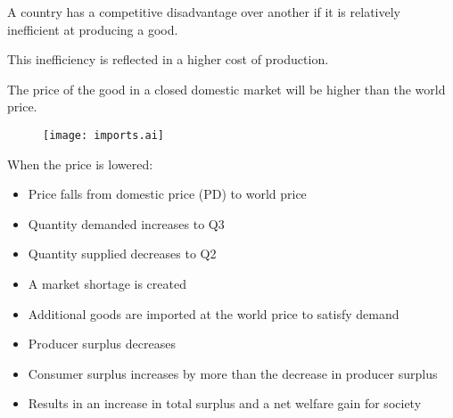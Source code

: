 \documentclass[a4paper,11pt]{article}
\begin{document}
A country has a competitive disadvantage over another if it is relatively
inefficient at producing a good.

This inefficiency is reflected in a higher cost of production.

The price of the good in a closed domestic market will be higher than the world
price.

\begin{figure}
\begin{center}
\texttt{[image: imports.ai]}
\end{center}
\end{figure}

When the price is lowered:

\begin{itemize}
\item Price falls from domestic price (PD) to world price
\item Quantity demanded increases to Q3
\item Quantity supplied decreases to Q2
\item A market shortage is created
\item Additional goods are imported at the world price to satisfy demand
\item Producer surplus decreases
\item Consumer surplus increases by more than the decrease in producer surplus
\item Results in an increase in total surplus and a net welfare gain for society
\end{itemize}
\end{document}
